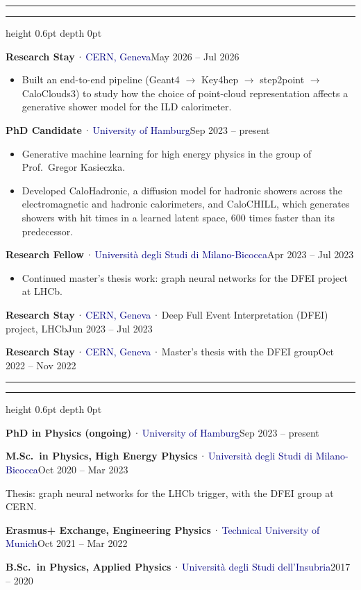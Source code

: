 \documentclass[10pt]{article}
\newcommand{\org}[1]{\textcolor{navy}{#1}}
\newcommand{\sep}{\,\textcolor{muted}{·}\,}
\newcommand{\dates}[1]{\hfill\textcolor{muted}{#1}}
\newcommand{\cvsection}[1]{%
  \par\vspace{6pt}%
  {\color{accent}\rule{5pt}{5pt}}\hspace{6pt}%
  {\color{navy}\bfseries\small\textls[180]{\MakeUppercase{#1}}}\hspace{6pt}%
  {\color{rulegray}\leaders\hrule height 0.6pt depth 0pt\hfill}\par\vspace{4pt}}
\newcommand{\entry}[4]{\par\vspace{3pt}\textbf{#1}\sep\org{#2}#3\dates{#4}\par}
\begin{document}
\cvsection{Research Experience}
\entry{Research Stay}{CERN, Geneva}{}{May 2026 -- Jul 2026}
\begin{itemize}
  \item Built an end-to-end pipeline (Geant4 $\to$ Key4hep $\to$ step2point $\to$ CaloClouds3) to study how the choice of point-cloud representation affects a generative shower model for the ILD calorimeter.
\end{itemize}
\entry{PhD Candidate}{University of Hamburg}{}{Sep 2023 -- present}
\begin{itemize}
  \item Generative machine learning for high energy physics in the group of Prof.\ Gregor Kasieczka.
  \item Developed CaloHadronic, a diffusion model for hadronic showers across the electromagnetic and hadronic calorimeters, and CaloCHILL, which generates showers with hit times in a learned latent space, 600 times faster than its predecessor.
\end{itemize}
\entry{Research Fellow}{Università degli Studi di Milano-Bicocca}{}{Apr 2023 -- Jul 2023}
\begin{itemize}
  \item Continued master's thesis work: graph neural networks for the DFEI project at LHCb.
\end{itemize}
\entry{Research Stay}{CERN, Geneva}{\sep Deep Full Event Interpretation (DFEI) project, LHCb}{Jun 2023 -- Jul 2023}
\entry{Research Stay}{CERN, Geneva}{\sep Master's thesis with the DFEI group}{Oct 2022 -- Nov 2022}

\cvsection{Education}
\entry{PhD in Physics (ongoing)}{University of Hamburg}{}{Sep 2023 -- present}
\entry{M.Sc.\ in Physics, High Energy Physics}{Università degli Studi di Milano-Bicocca}{}{Oct 2020 -- Mar 2023}
Thesis: graph neural networks for the LHCb trigger, with the DFEI group at CERN.\par
\entry{Erasmus+ Exchange, Engineering Physics}{Technical University of Munich}{}{Oct 2021 -- Mar 2022}
\entry{B.Sc.\ in Physics, Applied Physics}{Università degli Studi dell'Insubria}{}{2017 -- 2020}
\end{document}
